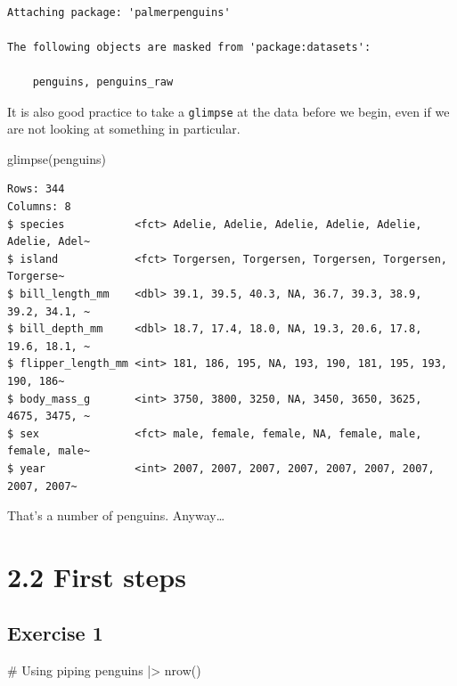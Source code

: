 \documentclass[
  letterpaper,
  DIV=11,
  numbers=noendperiod]{scrreprt}
\newenvironment{Shaded}{\begin{snugshade}}{\end{snugshade}}
\newcommand{\CommentTok}[1]{\textcolor[rgb]{0.37,0.37,0.37}{#1}}
\newcommand{\FunctionTok}[1]{\textcolor[rgb]{0.28,0.35,0.67}{#1}}
\newcommand{\NormalTok}[1]{\textcolor[rgb]{0.00,0.23,0.31}{#1}}
\newcommand{\SpecialCharTok}[1]{\textcolor[rgb]{0.37,0.37,0.37}{#1}}
\begin{document}
\begin{verbatim}

Attaching package: 'palmerpenguins'

The following objects are masked from 'package:datasets':

    penguins, penguins_raw
\end{verbatim}

It is also good practice to take a \texttt{glimpse} at the data before
we begin, even if we are not looking at something in particular.

\begin{Shaded}
\begin{Highlighting}[]
\FunctionTok{glimpse}\NormalTok{(penguins)}
\end{Highlighting}
\end{Shaded}

\begin{verbatim}
Rows: 344
Columns: 8
$ species           <fct> Adelie, Adelie, Adelie, Adelie, Adelie, Adelie, Adel~
$ island            <fct> Torgersen, Torgersen, Torgersen, Torgersen, Torgerse~
$ bill_length_mm    <dbl> 39.1, 39.5, 40.3, NA, 36.7, 39.3, 38.9, 39.2, 34.1, ~
$ bill_depth_mm     <dbl> 18.7, 17.4, 18.0, NA, 19.3, 20.6, 17.8, 19.6, 18.1, ~
$ flipper_length_mm <int> 181, 186, 195, NA, 193, 190, 181, 195, 193, 190, 186~
$ body_mass_g       <int> 3750, 3800, 3250, NA, 3450, 3650, 3625, 4675, 3475, ~
$ sex               <fct> male, female, female, NA, female, male, female, male~
$ year              <int> 2007, 2007, 2007, 2007, 2007, 2007, 2007, 2007, 2007~
\end{verbatim}

That's a number of penguins. Anyway\ldots{}

\section{2.2 First steps}\label{first-steps}

\subsection{Exercise 1}\label{exercise-1-7}

\begin{Shaded}
\begin{Highlighting}[]
\CommentTok{\# Using piping}
\NormalTok{penguins }\SpecialCharTok{|\textgreater{}} \FunctionTok{nrow}\NormalTok{()}
\end{Highlighting}
\end{Shaded}
\end{document}
